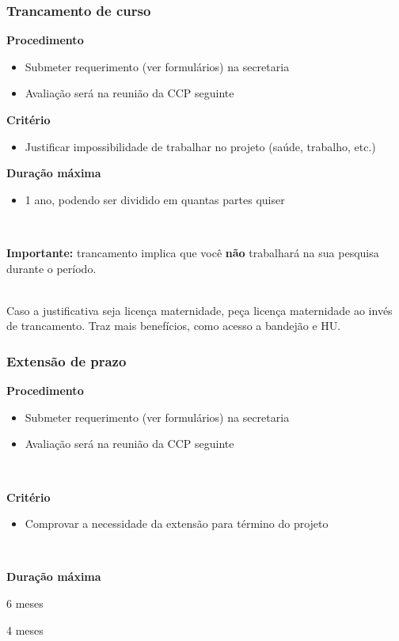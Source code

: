 \documentclass{beamer}
\begin{document}
\begin{frame}
  \frametitle{Trancamento de curso}

  \textbf{Procedimento}
  \begin{itemize}
    \item Submeter requerimento (ver formulários) na secretaria
    \item Avaliação será na reunião da CCP seguinte
  \end{itemize}\pause

  \textbf{Critério}
  \begin{itemize}
    \item Justificar impossibilidade de trabalhar no projeto (saúde, trabalho, etc.)
  \end{itemize}\pause

  \textbf{Duração máxima}
  \begin{itemize}
    \item 1 ano, podendo ser dividido em quantas partes quiser
  \end{itemize}~\\\pause

  \textbf{Importante:} trancamento implica que você \textbf{não} trabalhará na sua pesquisa durante
  o período.\\~\\\pause

  Caso a justificativa seja licença maternidade, peça licença maternidade ao invés de trancamento.
  Traz mais benefícios, como acesso a bandejão e HU.
\end{frame}

\begin{frame}
  \frametitle{Extensão de prazo}

  \textbf{Procedimento}
  \begin{itemize}
    \item Submeter requerimento (ver formulários) na secretaria
    \item Avaliação será na reunião da CCP seguinte
  \end{itemize}~\\\pause

  \textbf{Critério}
  \begin{itemize}
    \item Comprovar a necessidade da extensão para término do projeto
  \end{itemize}~\\\pause

  \textbf{Duração máxima}
  \begin{description}[Doutorado]
    \item[Mestrado:] 6 meses
    \item[Doutorado:] 4 meses
  \end{description}
\end{frame}
\end{document}
